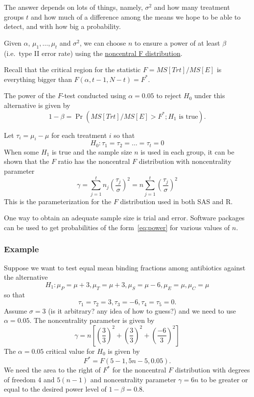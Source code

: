 The answer depends on lots of things, namely, $\sigma^2$ and how many treatment groups $t$ and how much of a difference among the means we hope to be able to detect, and with how big a probability.

Given $\alpha$, $\mu_1, \dots, \mu_t$ and $\sigma^2$, we can choose $n$ to ensure a power of at least $\beta$ (i.e.~type II error rate) using the \underline{noncentral F distribution}.

Recall that the critical region for the statistic $F = MS[Trt]/MS[E]$ is everything bigger than $F(\alpha, t- 1, N - t) = F^*$.

The power of the $F$-test conducted using $\alpha = 0.05$ to reject $H_0$ under this alternative is given by
\begin{equation}
1 - \beta = \Pr(MS[Trt]/MS[E]>F^*; H_1 \mbox{ is true}).
\label{eq:power}
\end{equation}

Let $\tau_i = \mu_i - \mu$ for each treatment $i$ so that
$$
H_0: \tau_1 = \tau_2 = \dots = \tau_t = 0
$$
When some $H_1$ is true and the sample size $n$ is used in each group, it can be shown that the $F$ ratio has the noncentral $F$ distribution with noncentrality parameter
$$
\gamma = \sum\limits_{j = 1}^t n_j \left(\frac{\tau_j}{\sigma}\right)^2 = n\sum\limits_{j = 1}^t \left(\frac{\tau_j}{\sigma}\right)^2
$$
This is the parameterization for the $F$ distribution used in both SAS and R.

One way to obtain an adequate sample size is trial and error.
Software packages can be used to get probabilities of the form~\ref{eq:power} for various values of $n$.

\subsubsection*{Example}
Suppose we want to test equal mean binding fractions among antibiotics against the alternative
$$
H_1:\mu_P = \mu + 3, \mu_T = \mu + 3, \mu_S = \mu - 6, \mu_E = \mu, \mu_C = \mu
$$
so that 
$$
\tau_1 = \tau_2 = 3, \tau_3 = -6, \tau_4 = \tau_5 = 0.
$$
Assume $\sigma = 3$ (is it arbitrary? any idea of how to guess?) and we need to use $\alpha = 0.05$.
The noncentrality parameter is given by
$$
\gamma = n[(\frac{3}{3})^2 + (\frac{3}{3})^2 + (\frac{-6}{3})^2]
$$
The $\alpha = 0.05$ critical value for $H_0$ is given by
$$
F^* = F(5 - 1, 5n - 5, 0.05).
$$
We need the area to the right of $F^*$ for the noncentral $F$ distribution with degrees of freedom $4$ and $5(n - 1)$ and noncentrality parameter $\gamma = 6n$ to be greater or equal to the desired power level of $1 - \beta = 0.8$.

